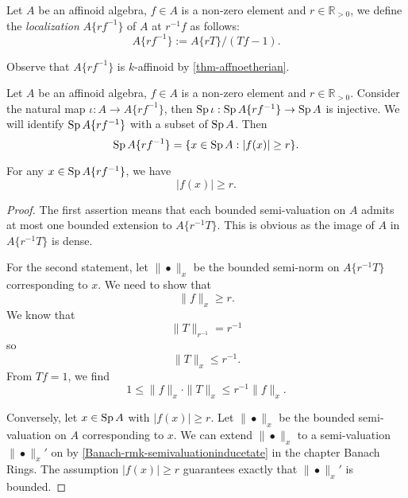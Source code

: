 \begin{definition}\label{def-localizationaff}
    Let $A$ be an affinoid algebra, $f\in A$ is a non-zero element and $r\in \mathbb{R}_{>0}$, we define the \emph{localization} $A\{rf^{-1}\}$ of $A$ at $r^{-1}f$ as follows:
    \[
        A\{rf^{-1}\}:=A\{rT\}/(Tf-1).
    \]
\end{definition}
Observe that $A\{rf^{-1}\}$ is $k$-affinoid by \cref{thm-affnoetherian}. 

\begin{proposition}\label{prop-afflocalizationprop}
    Let $A$ be an affinoid algebra, $f\in A$ is a non-zero element and $r\in \mathbb{R}_{>0}$.
    Consider the natural map $\iota:A\rightarrow A\{rf^{-1}\}$, then $\operatorname{Sp} \iota:\operatorname{Sp} A\{rf^{-1}\}\rightarrow \operatorname{Sp} A$ is injective. We will identify $\operatorname{Sp} A\{rf^{-1}\}$ with a subset of $\operatorname{Sp} A$. Then
    \[
        \operatorname{Sp} A\{rf^{-1}\}= \{x\in \operatorname{Sp} A: |f(x)|\geq r\}.
    \]

    For any $x\in \operatorname{Sp} A\{rf^{-1}\}$, we have
    \[
        |f(x)|\geq r.  
    \]
\end{proposition}
\begin{proof}
    The first assertion means that each bounded semi-valuation on $A$ admits at most one bounded extension to $A\{r^{-1}T\}$. This is obvious as the image of $A$ in $A\{r^{-1}T\}$ is dense.

    For the second statement, let $\|\bullet\|_x$ be the bounded semi-norm on $A\{r^{-1}T\}$ corresponding to $x$. We need to show that
    \[
        \|f\|_x \geq r.  
    \]
    We know that 
    \[
        \|T\|_{r^{-1}}=r^{-1}  
    \]
    so 
    \[
        \|T\|_x\leq r^{-1}.  
    \]
    From $Tf=1$, we find
    \[
        1\leq \|f\|_x\cdot \|T\|_x\leq r^{-1}  \|f\|_x.
    \]

    Conversely, let $x\in \operatorname{Sp} A$ with $|f(x)|\geq r$. Let $\|\bullet\|_x$ be the bounded semi-valuation on $A$ corresponding to $x$. We can extend $\|\bullet\|_x$ to a semi-valuation $\|\bullet\|_x'$ on by \cref{Banach-rmk-semivaluationinducetate} in the chapter Banach Rings. The assumption $|f(x)|\geq r$ guarantees exactly that $\|\bullet\|_x'$ is bounded.
\end{proof}


